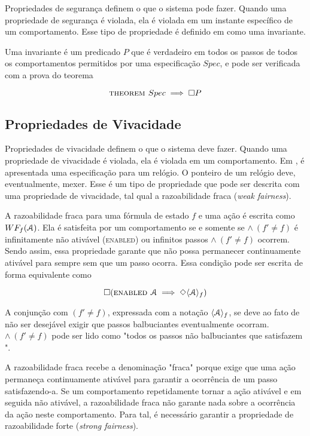 Propriedades de segurança definem o que o sistema pode fazer. Quando uma propriedade de segurança é violada, ela é violada em um instante específico de um comportamento. Esse tipo de propriedade é definido em \TLA como uma invariante.

Uma invariante é um predicado $P$ que é verdadeiro em todos os passos de todos os comportamentos permitidos por uma especificação $Spec$, e pode ser verificada com a prova do teorema

\[\textsc{theorem } Spec \implies \square P\]

\subsection{Propriedades de Vivacidade}

Propriedades de vivacidade definem o que o sistema deve fazer. Quando uma propriedade de vivacidade é violada, ela é violada em um comportamento. Em \cite{specifying-systems}, é apresentada uma especificação para um relógio. O ponteiro de um relógio deve, eventualmente, mexer. Esse é um tipo de propriedade que pode ser descrita com uma propriedade de vivacidade, tal qual a razoabilidade fraca (\textit{weak fairness}).

A razoabilidade fraca para uma fórmula de estado $f$ e uma ação \FANCYA é escrita como $WF_f (\textbf{$\mathcal{A}$})$. Ela é satisfeita por um comportamento se e somente se \FANCYA $\land\ (f' \neq f)$ é infinitamente não ativável (\textsc{enabled}) ou infinitos passos \FANCYA $\land\ (f' \neq f)$ ocorrem. Sendo assim, essa propriedade garante que \FANCYA não possa permanecer continuamente ativável para sempre sem que um passo \FANCYA ocorra. Essa condição pode ser escrita de forma equivalente como

\[\square (\textsc{enabled } \textbf{$\mathcal{A}$} \implies \Diamond\langle\textbf{$\mathcal{A}$}\rangle_f)\]

A conjunção com $(f' \neq f)$, expressada com a notação $\langle\textbf{$\mathcal{A}$}\rangle_f$, se deve ao fato de não ser desejável exigir que passos balbuciantes eventualmente ocorram. \FANCYA $\land\ (f' \neq f)$ pode ser lido como "todos os passos não balbuciantes que satisfazem \FANCYA".

A razoabilidade fraca recebe a denominação "fraca" porque exige que uma ação permaneça continuamente ativável para garantir a ocorrência de um passo satisfazendo-a. Se um comportamento repetidamente tornar a ação ativável e em seguida não ativável, a razoabilidade fraca não garante nada sobre a ocorrência da ação neste comportamento. Para tal, é necessário garantir a propriedade de razoabilidade forte (\textit{strong fairness}).

